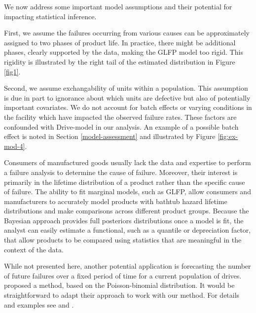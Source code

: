 \documentclass[12pt]{article}
\begin{document}
We now address some important model assumptions and their potential for impacting statistical inference. 

First, we assume the failures occurring from various causes can be approximately assigned to two phases of product life.  In practice, there might be additional phases, clearly supported by the data, making the GLFP model too rigid. This rigidity is illustrated by the right tail of the estimated distribution in Figure \ref{fig1}.

Second, we assume exchangability of units within a population. This assumption is due in part to ignorance about which units are defective but also of potentially important covariates. We do not account for batch effects or varying conditions in the facility which have impacted the observed failure rates. These factors are confounded with Drive-model in our analysis. An example of a possible batch effect is noted in Section \ref{model-assessment} and illustrated by Figure \ref{fig:ex-mod-4}. 

Consumers of manufactured goods usually lack the data and expertise to perform a failure analysis to determine the cause of failure.  Moreover, their interest is primarily in the lifetime distribution of a product rather than the specific cause of failure.  The ability to fit marginal models, such as GLFP, allow consumers and manufacturers to accurately model products with bathtub hazard lifetime distributions and make comparisons across different product groups.  Because the Bayesian approach provides full posteriors distributions once a model is fit, the analyst can easily estimate a functional, such as a quantile or depreciation factor, that allow products to be compared using statistics that are meaningful in the context of the data. 

While not presented here, another potential application is forecasting the number of future failures over a fixed period of time for a current population of drives. \citet{hmm} proposed a method, based on the Poisson-binomial distribution. It would be straightforward to adapt their approach to work with our method. For details and examples see \citet[Sect.~6]{hmm} and \citet{xu2015assessing}.

\end{document}

